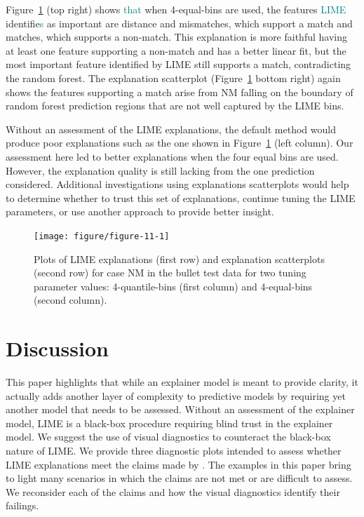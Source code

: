 \documentclass[AMS,STIX2COL]{WileyNJD-v2}\usepackage[]{graphicx}\usepackage[]{color}
\newenvironment{knitrout}{}{} %
\newcommand{\kge}[1]{\textcolor{teal}{#1}}
\renewcommand{\sout}[1]{\unskip}
\begin{document}
Figure~\ref{fig:figure-11} (top right) shows \sout{the LIME explanation for case NM} \kge{that} when 4-equal-bins are used\sout{. Here}, the features \kge{LIME} identifie\sout{d}\kge{s} as important are distance and mismatches, which support a match and matches, which supports a non-match. This explanation is more faithful having at least one feature supporting a non-match and has a better linear fit, but the most important feature identified by LIME still supports a match, contradicting the random forest. The explanation scatterplot (Figure~\ref{fig:figure-11} bottom right) again shows the features supporting a match arise from NM falling on the boundary of random forest prediction regions that are not well captured by the LIME bins.

Without an assessment of the LIME explanations, the default method would produce poor explanations such as the one shown in Figure~\ref{fig:figure-11} (left column). Our assessment here led to better explanations when the four equal bins are used. However, the explanation quality is still lacking from the one prediction considered. Additional investigations using explanations scatterplots would help to determine whether to trust this set of explanations, continue tuning the LIME parameters, or use another approach to provide better insight.

\begin{figure}[!thp]
\begin{knitrout}
\color{fgcolor}

{\centering \texttt{[image: figure/figure-11-1]} 

}



\end{knitrout}
\caption{Plots of LIME explanations (first row) and explanation scatterplots (second row) for case NM in the bullet test data for two tuning parameter values: 4-quantile-bins (first column) and 4-equal-bins (second column).}
\label{fig:figure-11}
\end{figure}

\section{Discussion} \label{discussion}

This paper highlights that while an explainer model is meant to provide clarity, it actually adds another layer of complexity to predictive models by requiring yet another model that needs to be assessed. Without an assessment of the explainer model, LIME is a black-box procedure requiring blind trust in the explainer model. We suggest the use of visual diagnostics to counteract the black-box nature of LIME. We provide three diagnostic plots intended to assess whether LIME explanations meet the claims made by \citet{ribeiro:2016}. The examples in this paper bring to light many scenarios in which the claims are not met or are difficult to assess. We reconsider each of the claims and how the visual diagnostics identify their failings.
\end{document}
